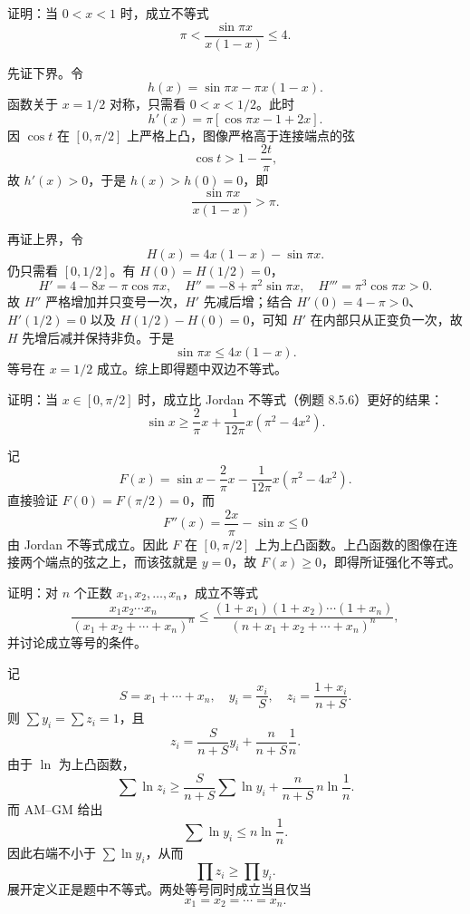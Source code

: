 \begin{xreferenceproblem}[9]
证明：当 $0<x<1$ 时，成立不等式
  \[
    \pi<\frac{\sin\pi x}{x(1-x)}\le4.
  \]
\end{xreferenceproblem}
\begin{xsolution}
先证下界。令
\[
  h(x)=\sin\pi x-\pi x(1-x).
\]
函数关于 $x=1/2$ 对称，只需看 $0<x<1/2$。此时
\[
  h'(x)=\pi[\cos\pi x-1+2x].
\]
因 $\cos t$ 在 $[0,\pi/2]$ 上严格上凸，图像严格高于连接端点的弦
\[
  \cos t>1-\frac{2t}{\pi},
\]
故 $h'(x)>0$，于是 $h(x)>h(0)=0$，即
\[
  \frac{\sin\pi x}{x(1-x)}>\pi.
\]

再证上界，令
\[
  H(x)=4x(1-x)-\sin\pi x.
\]
仍只需看 $[0,1/2]$。有 $H(0)=H(1/2)=0$，
\[
  H'=4-8x-\pi\cos\pi x,
  \quad H''=-8+\pi^2\sin\pi x,
  \quad H'''=\pi^3\cos\pi x>0.
\]
故 $H''$ 严格增加并只变号一次，$H'$ 先减后增；结合 $H'(0)=4-\pi>0$、$H'(1/2)=0$ 以及 $H(1/2)-H(0)=0$，可知 $H'$ 在内部只从正变负一次，故 $H$ 先增后减并保持非负。于是
\[
  \sin\pi x\le4x(1-x).
\]
等号在 $x=1/2$ 成立。综上即得题中双边不等式。
\end{xsolution}


\begin{xreferenceproblem}[10]
证明：当 $x\in[0,\pi/2]$ 时，成立比 Jordan 不等式（例题 8.5.6）更好的结果：
  \[
    \sin x\ge\frac2\pi x+\frac1{12\pi}x(\pi^2-4x^2).
  \]
\end{xreferenceproblem}
\begin{xsolution}
记
\[
  F(x)=\sin x-\frac2\pi x-\frac1{12\pi}x(\pi^2-4x^2).
\]
直接验证 $F(0)=F(\pi/2)=0$，而
\[
  F''(x)=\frac{2x}{\pi}-\sin x\le0
\]
由 Jordan 不等式成立。因此 $F$ 在 $[0,\pi/2]$ 上为上凸函数。上凸函数的图像在连接两个端点的弦之上，而该弦就是 $y=0$，故 $F(x)\ge0$，即得所证强化不等式。
\end{xsolution}


\begin{xreferenceproblem}[11]
证明：对 $n$ 个正数 $x_1,x_2,\ldots,x_n$，成立不等式
  \[
    \frac{x_1x_2\cdots x_n}{(x_1+x_2+\cdots+x_n)^n}
    \le
    \frac{(1+x_1)(1+x_2)\cdots(1+x_n)}{(n+x_1+x_2+\cdots+x_n)^n},
  \]
  并讨论成立等号的条件。
\end{xreferenceproblem}
\begin{xsolution}
记
\[
  S=x_1+\cdots+x_n,
  \quad y_i=\frac{x_i}{S},
  \quad z_i=\frac{1+x_i}{n+S}.
\]
则 $\sum y_i=\sum z_i=1$，且
\[
  z_i=\frac{S}{n+S}y_i+\frac{n}{n+S}\frac1n.
\]
由于 $\ln$ 为上凸函数，
\[
  \sum\ln z_i
  \ge\frac{S}{n+S}\sum\ln y_i
   +\frac{n}{n+S}\,n\ln\frac1n.
\]
而 AM--GM 给出
\[
  \sum\ln y_i\le n\ln\frac1n.
\]
因此右端不小于 $\sum\ln y_i$，从而
\[
  \prod z_i\ge\prod y_i.
\]
展开定义正是题中不等式。两处等号同时成立当且仅当
\[
  x_1=x_2=\cdots=x_n.
\]
\end{xsolution}


